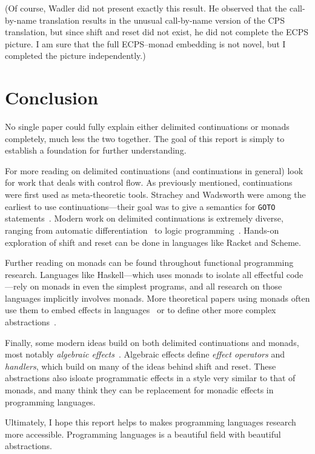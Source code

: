 \documentclass[acmsmall, nonacm, screen]{acmart}
\begin{document}
(Of course, Wadler did not present exactly this result. He observed that the call-by-name
translation results in the unusual call-by-name version of the CPS translation, but since shift
and reset did not exist, he did not complete the ECPS picture. I am sure that the full
ECPS--monad embedding is not novel, but I completed the picture independently.)

\section{Conclusion} \label{sec:conclusion}
No single paper could fully explain either delimited continuations or monads completely, much
less the two together. The goal of this report is simply to establish a foundation for further
understanding.

For more reading on delimited continuations (and continuations in general) look for work that
deals with control flow. As previously mentioned, continuations were first used as meta-theoretic
tools. Strachey and Wadsworth were among the earliest to use continuations---their goal was to
give a semantics for \texttt{GOTO} statements~\cite{strachey2000continuations}. Modern work on
delimited continuations is extremely diverse, ranging from automatic
differentiation~\cite{wang2019demystifying} to logic programming~\cite{schrijvers2013delimited}.
Hands-on exploration of shift and reset can be done in languages like Racket and Scheme.

Further reading on monads can be found throughout functional programming research. Languages like
Haskell---which uses monads to isolate all effectful code---rely on monads in even the simplest
programs, and all research on those languages implicitly involves monads. More theoretical papers
using monads often use them to embed effects in languages~\cite{paykin2017linearity} or to define
other more complex abstractions~\cite{xia2019interaction}.

Finally, some modern ideas build on both delimited continuations and monads, most notably {\em
algebraic effects}~\cite{bauer2015programming}. Algebraic effects define {\em effect operators}
and {\em handlers}, which build on many of the ideas behind shift and reset. These abstractions
also isloate programmatic effects in a style very similar to that of monads, and many think they
can be replacement for monadic effects in programming languages.

Ultimately, I hope this report helps to makes programming languages research more accessible.
Programming languages is a beautiful field with beautiful abstractions.



\end{document}
